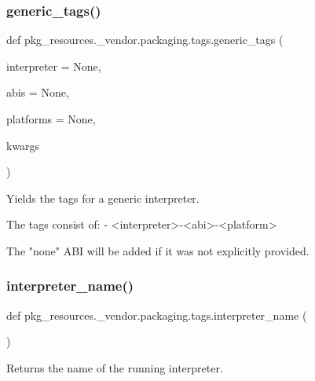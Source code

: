 \subsubsection{\texorpdfstring{generic\+\_\+tags()}{generic\_tags()}}
{\footnotesize\ttfamily def pkg\+\_\+resources.\+\_\+vendor.\+packaging.\+tags.\+generic\+\_\+tags (\begin{DoxyParamCaption}\item[{}]{interpreter = {\ttfamily None},  }\item[{}]{abis = {\ttfamily None},  }\item[{}]{platforms = {\ttfamily None},  }\item[{}]{kwargs }\end{DoxyParamCaption})}

\begin{DoxyVerb}Yields the tags for a generic interpreter.

The tags consist of:
- <interpreter>-<abi>-<platform>

The "none" ABI will be added if it was not explicitly provided.
\end{DoxyVerb}
 \mbox{\label{namespacepkg__resources_1_1__vendor_1_1packaging_1_1tags_a28c81244760f235f7028934246666d33}} 
\subsubsection{\texorpdfstring{interpreter\+\_\+name()}{interpreter\_name()}}
{\footnotesize\ttfamily def pkg\+\_\+resources.\+\_\+vendor.\+packaging.\+tags.\+interpreter\+\_\+name (\begin{DoxyParamCaption}{ }\end{DoxyParamCaption})}

\begin{DoxyVerb}Returns the name of the running interpreter.
\end{DoxyVerb}
 \mbox{\label{namespacepkg__resources_1_1__vendor_1_1packaging_1_1tags_a38446e3d5042ed39166438fec108aadf}} 
